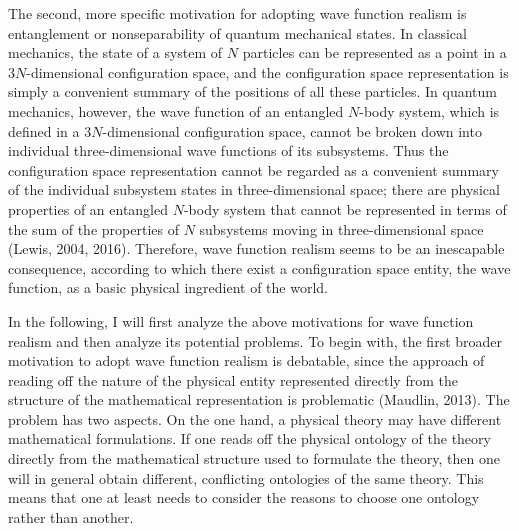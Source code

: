The second, more specific motivation for adopting wave function realism is entanglement or nonseparability of quantum mechanical states. 
In classical mechanics, the state of a system of $N$ particles can be represented as a point in a $3N$-dimensional configuration space, and the configuration space representation is simply a convenient summary of the positions of all these particles. In quantum mechanics, however, 
the wave function of an entangled $N$-body system, which is defined in a $3N$-dimensional configuration space, cannot be broken down into individual  three-dimensional wave functions of its subsystems. 
Thus the configuration space representation cannot be regarded as a convenient summary of the individual subsystem states in three-dimensional space; there are physical properties of an entangled $N$-body system that cannot be represented in terms of the sum of the properties of $N$ subsystems moving in three-dimensional space (Lewis, 2004, 2016). Therefore, wave function realism seems to be an inescapable consequence, according to which there exist a configuration space entity, the wave function, as a basic physical ingredient of the world.

In the following, I will first analyze the above motivations for wave function realism and then analyze its potential problems.
To begin with, the first broader motivation to adopt wave function realism is debatable, since the approach of reading off the nature of the physical entity represented directly from the structure of the mathematical representation is problematic (Maudlin, 2013).
The problem has two aspects. 
On the one hand, a physical theory may have different mathematical formulations. 
If one reads off the physical ontology of the theory directly from the mathematical structure used to formulate the theory, then one will in general obtain different, conflicting ontologies of the same theory.
This means that one at least needs to consider the reasons to choose one ontology rather than another.

